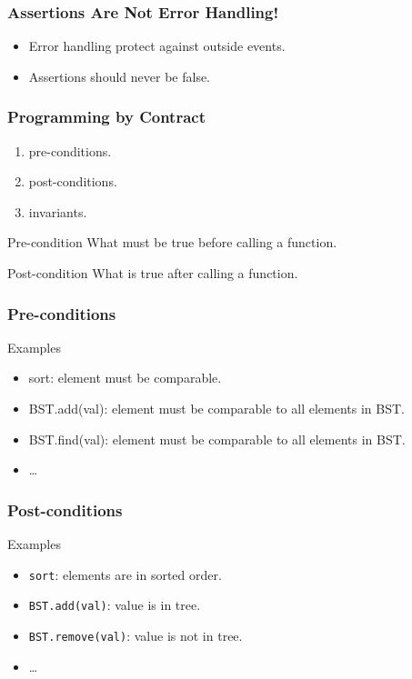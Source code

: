 \begin{frame}[fragile]
\frametitle{Assertions Are Not Error Handling!}

\begin{itemize}
\item Error handling protect against outside events.
\item Assertions \alert{should never} be false.
\end{itemize}
\end{frame}

\begin{frame}[fragile]
\frametitle{Programming by Contract}
\begin{enumerate}
\item pre-conditions.
\item post-conditions.
\item invariants.
\end{enumerate}
\end{frame}

\begin{frame}[fragile]

\begin{block}{Pre-condition}
What must be true before calling a function.
\end{block}

\begin{block}{Post-condition}
What is true after calling a function.
\end{block}
\end{frame}

\begin{frame}[fragile]
\frametitle{Pre-conditions}

\begin{block}{Examples}
\begin{itemize}
\item sort: element must be comparable.
\item BST.add(val): element must be comparable to all elements in BST.
\item BST.find(val): element must be comparable to all elements in BST.
\item \ldots
\end{itemize}
\end{block}
\end{frame}

\begin{frame}[fragile]
\frametitle{Post-conditions}

\begin{block}{Examples}
\begin{itemize}
\item \lstinline{sort}: elements are in sorted order.
\item \lstinline{BST.add(val)}: value is in tree.
\item \lstinline{BST.remove(val)}: value is not in tree.
\item \ldots
\end{itemize}
\end{block}
\end{frame}


